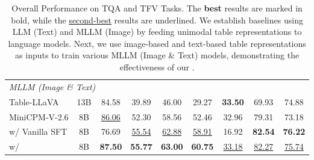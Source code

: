 \begin{table*}[t]
\begin{tabular}{l|c|ccccc|cc}
\multicolumn{9}{l}{{\cellcolor[rgb]{0.957,0.957,0.957}}\textit{MLLM (Image \& Text)}} \\
Table-LLaVA & 13B & 84.58 & 39.89 & 46.00 & 29.27 & \textbf{33.50} & 69.93 & 74.88\\
MiniCPM-V-2.6 & 8B & \uline{86.06} & 52.30 & 58.56 & 52.46 & 32.96 & 79.31 & 73.18 \\
w/ Vanilla SFT & 8B & 76.69 & \uline{55.54} & \uline{62.88} & \uline{58.91} & 16.92 & \textbf{82.54} & \textbf{76.22} \\
w/ \method{}  & 8B & \textbf{87.50} & \textbf{55.77} & \textbf{63.00} & \textbf{60.75} & \uline{33.18} & \uline{82.27} & \uline{75.74} \\
\hline
\end{tabular}
\caption{Overall Performance on TQA and TFV Tasks. The \textbf{best} results are marked in bold, while the \uline{second-best} results are underlined. We establish baselines using LLM (Text) and MLLM (Image) by feeding unimodal table representations to language models. Next, we use image-based and text-based table representations as inputs to train various MLLM (Image \& Text) models, demonstrating the effectiveness of our \method{}.} \label{tab:overall}
\end{table*}